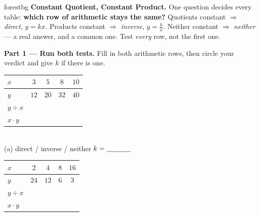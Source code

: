 \documentclass[10pt]{article}
\begin{document}
\namepartnerperiod

\vspace{0.08in}

\begin{headlinebox}{forestbg}
\small\textbf{Constant Quotient, Constant Product.} One question decides every table:
\textbf{which row of arithmetic stays the same?} Quotients constant $\Rightarrow$ \emph{direct},
$y=kx$. Products constant $\Rightarrow$ \emph{inverse}, $y=\frac kx$. Neither constant
$\Rightarrow$ \emph{neither} --- a real answer, and a common one. Test \emph{every} row, not the
first one.
\end{headlinebox}

\vspace{0.06in}

\begin{tcolorbox}[colback=white, colframe=black!40, title=\textbf{Tier R --- Remediate},
    fonttitle=\bfseries, arc=1.5mm, left=3mm, right=3mm, top=2mm, bottom=2mm, breakable]
\textbf{Part 1 --- Run both tests.} Fill in both arithmetic rows, then circle your verdict and give
$k$ if there is one.
\begin{center}
\begin{minipage}{0.47\linewidth}\centering
\renewcommand{\arraystretch}{1.25}
\begin{tabular}{|l|c|c|c|c|}
\hline
\rowcolor{forestbg}
$x$ & $3$ & $5$ & $8$ & $10$ \\ \hline
$y$ & $12$ & $20$ & $32$ & $40$ \\ \hline
$y\div x$ & & & & \\ \hline
$x\cdot y$ & & & & \\ \hline
\end{tabular}\\[2pt]
{\small (a) \; direct \; / \; inverse \; / \; neither \quad $k=\blank{1.2cm}$}
\end{minipage}\hfill
\begin{minipage}{0.47\linewidth}\centering
\renewcommand{\arraystretch}{1.25}
\begin{tabular}{|l|c|c|c|c|}
\hline
\rowcolor{forestbg}
$x$ & $2$ & $4$ & $8$ & $16$ \\ \hline
$y$ & $24$ & $12$ & $6$ & $3$ \\ \hline
$y\div x$ & & & & \\ \hline
$x\cdot y$ & & & & \\ \hline
\end{tabular}\\[2pt]

\end{minipage}
\end{center}
\end{tcolorbox}
\end{document}
